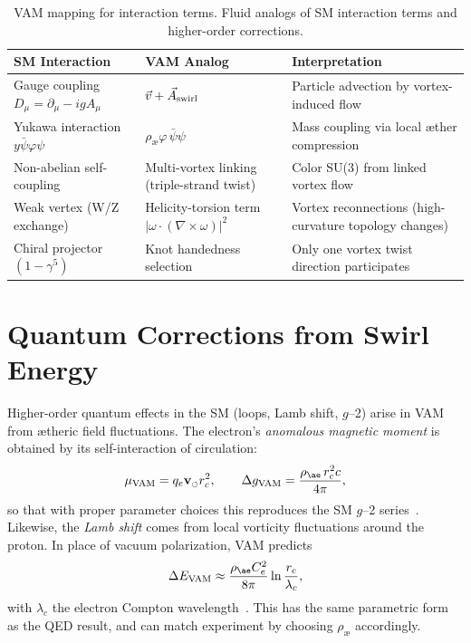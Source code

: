 \documentclass[a4paper,12pt]{article}
\begin{document}
\begin{table}[H]
    \centering
    \begin{tabular}{lll}
        \toprule
        \textbf{SM Interaction} & \textbf{VAM Analog} & \textbf{Interpretation} \\
        \midrule
        Gauge coupling $D_\mu = \partial_\mu - igA_\mu$ & $\vec{v} + \vec{A}_{\rm swirl}$~\cite{vam-lagrangian} & Particle advection by vortex-induced flow \\
        Yukawa interaction $y\bar{\psi}\varphi\psi$ & $\rho_{æ}\varphi\,\bar{\psi}\psi$~\cite{vam-lagrangian} & Mass coupling via local æther compression \\
        Non-abelian self-coupling & Multi-vortex linking (triple-strand twist)~\cite{vam-lagrangian} & Color SU(3) from linked vortex flow \\
        Weak vertex (W/Z exchange) & Helicity-torsion term $|\omega\cdot(\nabla\times\omega)|^2$~\cite{vam-weak} & Vortex reconnections (high-curvature topology changes) \\
        Chiral projector $(1-\gamma^5)$ & Knot handedness selection & Only one vortex twist direction participates~\cite{vam-weak} \\
        \bottomrule
    \end{tabular}
    \caption{VAM mapping for interaction terms. Fluid analogs of SM interaction terms and higher-order corrections.}
    \label{tab:interaction-map2}
\end{table}

\section*{Quantum Corrections from Swirl Energy}

Higher-order quantum effects in the SM (loops, Lamb shift, $g$--2) arise in VAM from ætheric field fluctuations. The electron's \emph{anomalous magnetic moment} is obtained by its self-interaction of circulation:
\begin{equation}
    \mu_{\rm VAM} = q_e \mathbf{v}_{\scriptscriptstyle\boldsymbol{\circlearrowleft}} r_c^2, \qquad
    \Delta g_{\rm VAM} = \frac{\rho_{æ}\, r_c^2 c}{4\pi},
\end{equation}
so that with proper parameter choices this reproduces the SM $g$--2 series~\cite{vam-g2}. Likewise, the \emph{Lamb shift} comes from local vorticity fluctuations around the proton. In place of vacuum polarization, VAM predicts
\begin{equation}
    \Delta E_{\rm VAM} \approx \frac{\rho_{æ} C_e^2}{8\pi} \ln\frac{r_c}{\lambda_c},
\end{equation}
with $\lambda_c$ the electron Compton wavelength~\cite{vam-lamb}. This has the same parametric form as the QED result, and can match experiment by choosing $\rho_{æ}$ accordingly.
\end{document}
